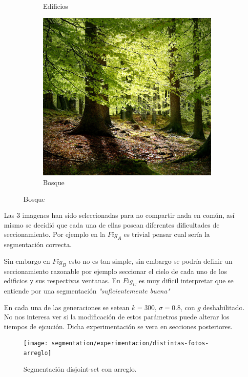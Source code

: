 \begin{figure}[H]
\begin{subfigure}{0.3\linewidth}
	\caption{Edificios}
	\end{subfigure}
	\begin{subfigure}{0.3\linewidth}
		\includegraphics[width=\linewidth]{segmentation/entradas-posta/bosque}
		\caption{Bosque}
	\end{subfigure}
\end{figure}

Las 3 imagenes han sido seleccionadas para no compartir nada en común, así mismo se decidió que cada una de ellas posean diferentes dificultades de seccionamiento. Por ejemplo en la $Fig_A$ es trivial pensar cual sería la segmentación correcta.

Sin embargo en $Fig_B$ esto no es tan simple, sin embargo se podría definir un seccionamiento razonable por ejemplo seccionar el cielo de cada uno de los edificios y sus respectivas ventanas. En $Fig_C$ es muy dificil interpretar que se entiende por una segmentación \textit{"suficientemente buena"}

En cada una de las generaciones se setean $k = 300$, $\sigma = 0.8$, con $g$ deshabilitado. No nos interesa ver si la modificación de estos parámetros puede alterar los tiempos de ejcución. Dicha experimentación se vera en secciones posteriores.


\begin{figure}[H]
	\centering
	\texttt{[image: segmentation/experimentacion/distintas-fotos-arreglo]}
	\caption{Segmentación disjoint-set con arreglo.}
\end{figure}

